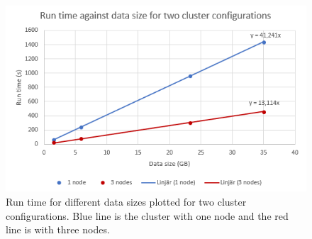 \begin{figure}[H]
    \centering
    \includegraphics[width=.75\linewidth]{figures/runTime2.PNG}
    \caption{Run time for different data sizes plotted for two cluster configurations. Blue line is the cluster with one node and the red line is with three nodes.}
    \label{fig:scalabilityGraph}
\end{figure}

